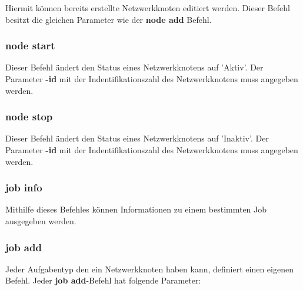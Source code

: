 \documentclass[11pt,a4paper]{report}
\begin{document}
Hiermit können bereits erstellte Netzwerkknoten editiert werden. Dieser Befehl besitzt die gleichen Parameter wie der \textbf{node add} Befehl.

\subsubsection{node start}

Dieser Befehl ändert den Status eines Netzwerkknotens auf 'Aktiv'. Der Parameter \textbf{-id} mit der Indentifikationszahl des Netzwerkknotens muss angegeben werden.

\subsubsection{node stop}

Dieser Befehl ändert den Status eines Netzwerkknotens auf 'Inaktiv'. Der Parameter \textbf{-id} mit der Indentifikationszahl des Netzwerkknotens muss angegeben werden.

\subsubsection{job info}

Mithilfe dieses Befehles können Informationen zu einem bestimmten Job ausgegeben werden.

\subsubsection{job add}

Jeder Aufgabentyp den ein Netzwerkknoten haben kann, definiert einen eigenen Befehl. Jeder \textbf{job add}-Befehl hat folgende Parameter:
\end{document}
